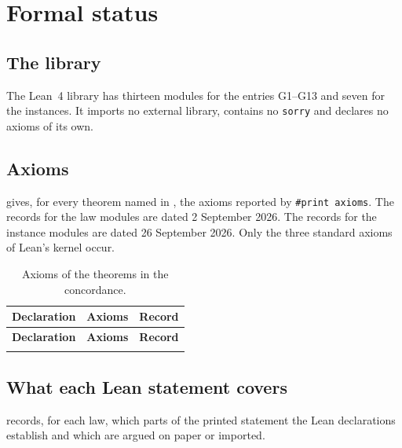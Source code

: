 \section{Formal status}
\label{supp:status}

\subsection{The library}

The Lean~4 library has thirteen modules for the entries G1--G13 and seven for the instances. It imports no external library, contains no \texttt{sorry} and declares no axioms of its
own.

\subsection{Axioms}

 gives, for every theorem named in , the axioms reported by
\texttt{\#print axioms}. The records for the law modules are dated 2 September 2026. The records for the instance modules are dated 26 September 2026. Only the three
standard axioms of Lean's kernel occur.

{\scriptsize
\begin{longtable}{@{}>{\raggedright\arraybackslash}p{8.6cm}>{\raggedright\arraybackslash}p{3.4cm}l@{}}
\caption{Axioms of the theorems in the concordance.}\label{tab:axioms}\\
\toprule
\textbf{Declaration} & \textbf{Axioms} & \textbf{Record} \\
\midrule
\endfirsthead
\toprule
\textbf{Declaration} & \textbf{Axioms} & \textbf{Record} \\
\midrule
\endhead
\bottomrule
\endfoot

\end{longtable}
}

\subsection{What each Lean statement covers}

 records, for each law, which parts of the printed statement the Lean declarations
establish and which are argued on paper or imported.

